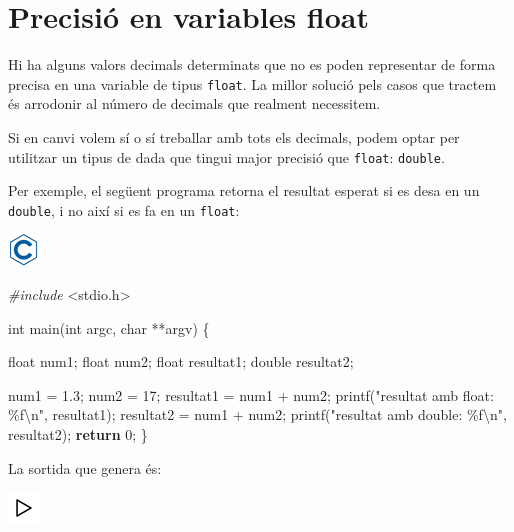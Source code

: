 \documentclass[]{book}
\newenvironment{Shaded}{\begin{snugshade}}{\end{snugshade}}
\newcommand{\ControlFlowTok}[1]{\textcolor[rgb]{0.13,0.29,0.53}{\textbf{#1}}}
\newcommand{\DataTypeTok}[1]{\textcolor[rgb]{0.13,0.29,0.53}{#1}}
\newcommand{\DecValTok}[1]{\textcolor[rgb]{0.00,0.00,0.81}{#1}}
\newcommand{\FloatTok}[1]{\textcolor[rgb]{0.00,0.00,0.81}{#1}}
\newcommand{\ImportTok}[1]{#1}
\newcommand{\NormalTok}[1]{#1}
\newcommand{\PreprocessorTok}[1]{\textcolor[rgb]{0.56,0.35,0.01}{\textit{#1}}}
\newcommand{\SpecialCharTok}[1]{\textcolor[rgb]{0.00,0.00,0.00}{#1}}
\newcommand{\StringTok}[1]{\textcolor[rgb]{0.31,0.60,0.02}{#1}}
\begin{document}
\hypertarget{precisio-en-variables-float}{%
\section{Precisió en variables float}\label{precisio-en-variables-float}}

Hi ha alguns valors decimals determinats que no es poden representar de forma precisa en una variable de tipus \texttt{float}. La millor solució pels casos que tractem és arrodonir al número de decimals que realment necessitem.

Si en canvi volem sí o sí treballar amb tots els decimals, podem optar per utilitzar un tipus de dada que tingui major precisió que \texttt{float}: \texttt{double}.

Per exemple, el següent programa retorna el resultat esperat si es desa en un \texttt{double}, i no així si es fa en un \texttt{float}:

\includegraphics{./img/c.png}

\begin{Shaded}
\begin{Highlighting}[]
\PreprocessorTok{\#include }\ImportTok{\textless{}stdio.h\textgreater{}}

\DataTypeTok{int}\NormalTok{ main(}\DataTypeTok{int}\NormalTok{ argc, }\DataTypeTok{char}\NormalTok{ **argv) \{ }

    \DataTypeTok{float}\NormalTok{ num1; }
    \DataTypeTok{float}\NormalTok{ num2;}
    \DataTypeTok{float}\NormalTok{ resultat1; }
    \DataTypeTok{double}\NormalTok{ resultat2; }
    
\NormalTok{    num1 = }\FloatTok{1.3}\NormalTok{; }
\NormalTok{    num2 = }\DecValTok{17}\NormalTok{;}
\NormalTok{    resultat1 = num1 + num2; }
\NormalTok{    printf(}\StringTok{"resultat amb float: \%f}\SpecialCharTok{\textbackslash{}n}\StringTok{"}\NormalTok{, resultat1); }
\NormalTok{    resultat2 = num1 + num2; }
\NormalTok{    printf(}\StringTok{"resultat amb double: \%f}\SpecialCharTok{\textbackslash{}n}\StringTok{"}\NormalTok{, resultat2); }
    \ControlFlowTok{return} \DecValTok{0}\NormalTok{; }
\NormalTok{\}}
\end{Highlighting}
\end{Shaded}

La sortida que genera és:

\includegraphics{./img/play.png}
\end{document}
